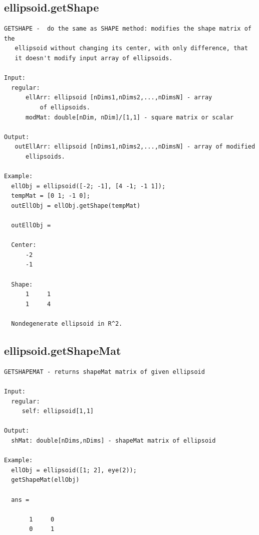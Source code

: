 \subsection{\texorpdfstring{ellipsoid.getShape}{getShape}}\label{method:ellipsoid.getShape}
\begin{verbatim}
GETSHAPE -  do the same as SHAPE method: modifies the shape matrix of the
   ellipsoid without changing its center, with only difference, that
   it doesn't modify input array of ellipsoids.

Input:
  regular:
      ellArr: ellipsoid [nDims1,nDims2,...,nDimsN] - array
          of ellipsoids.
      modMat: double[nDim, nDim]/[1,1] - square matrix or scalar

Output:
   outEllArr: ellipsoid [nDims1,nDims2,...,nDimsN] - array of modified
      ellipsoids.

Example:
  ellObj = ellipsoid([-2; -1], [4 -1; -1 1]);
  tempMat = [0 1; -1 0];
  outEllObj = ellObj.getShape(tempMat)

  outEllObj =

  Center:
      -2
      -1

  Shape:
      1     1
      1     4

  Nondegenerate ellipsoid in R^2.
\end{verbatim}
\subsection{\texorpdfstring{ellipsoid.getShapeMat}{getShapeMat}}\label{method:ellipsoid.getShapeMat}
\begin{verbatim}
GETSHAPEMAT - returns shapeMat matrix of given ellipsoid

Input:
  regular:
     self: ellipsoid[1,1]

Output:
  shMat: double[nDims,nDims] - shapeMat matrix of ellipsoid

Example:
  ellObj = ellipsoid([1; 2], eye(2));
  getShapeMat(ellObj)

  ans =

       1     0
       0     1
\end{verbatim}

